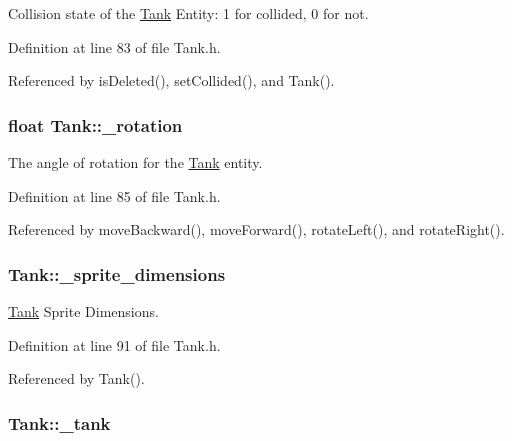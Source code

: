 Collision state of the \hyperlink{classTank}{Tank} Entity\-: 1 for collided, 0 for not. 



Definition at line 83 of file Tank.\-h.



Referenced by is\-Deleted(), set\-Collided(), and Tank().

\hypertarget{classTank_a2fe3c5fe01a1faadae727c6a667b7cc9}{
\subsubsection[{\-\_\-rotation}]{\setlength{\rightskip}{0pt plus 5cm}float Tank\-::\-\_\-rotation\hspace{0.3cm}{\ttfamily [private]}}}\label{classTank_a2fe3c5fe01a1faadae727c6a667b7cc9}


The angle of rotation for the \hyperlink{classTank}{Tank} entity. 



Definition at line 85 of file Tank.\-h.



Referenced by move\-Backward(), move\-Forward(), rotate\-Left(), and rotate\-Right().

\hypertarget{classTank_ae63c3e90ba5e3f9a3bfb8172865716fb}{
\subsubsection[{\-\_\-sprite\-\_\-dimensions}]{ Tank\-::\-\_\-sprite\-\_\-dimensions\hspace{0.3cm}{\ttfamily [private]}}}\label{classTank_ae63c3e90ba5e3f9a3bfb8172865716fb}


\hyperlink{classTank}{Tank} Sprite Dimensions. 



Definition at line 91 of file Tank.\-h.



Referenced by Tank().

\hypertarget{classTank_ab54320f716bcac8aa4073aab09fc958b}{
\subsubsection[{\-\_\-tank}]{ Tank\-::\-\_\-tank\hspace{0.3cm}{\ttfamily [private]}}}\label{classTank_ab54320f716bcac8aa4073aab09fc958b}


